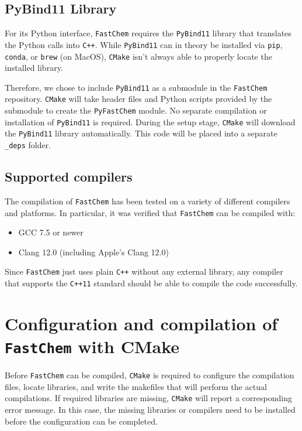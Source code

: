\documentclass[numbers=noenddot]{aux/fcmanual}
\newcommand{\fc}{\texttt{FastChem}\xspace}
\newcommand{\cpp}{\ttt{C++}\xspace}
\newcommand{\pb}{\texttt{PyBind11}\xspace}
\newcommand{\ttt}[1]{\texttt {#1}}
\begin{document}
\subsection{PyBind11 Library}

For its Python interface, \fc requires the \pb library that translates the Python calls into \cpp. While \pb can in theory be installed via \texttt{pip}, \texttt{conda}, or \texttt{brew} (on MacOS), \texttt{CMake} isn't always able to properly locate the installed library. 

Therefore, we chose to include \pb as a submodule in the \fc repository. \texttt{CMake} will take header files and Python scripts provided by the submodule to create the \texttt{PyFastChem} module. No separate compilation or installation of \pb is required. During the setup stage, \texttt{CMake} will download the \pb library automatically. This code will be placed into a separate \texttt{\_deps} folder.


\subsection{Supported compilers}

The compilation of \fc has been tested on a variety of different compilers and platforms. In particular, it was verified that \fc can be compiled with:
\begin{itemize}
  \item GCC 7.5 or newer
  \item Clang 12.0 (including Apple's Clang 12.0)
\end{itemize}

Since \fc just uses plain \cpp without any external library, any compiler that supports the \ttt{C++11} standard should be able to compile the code successfully.


\section{Configuration and compilation of \fc with CMake}
\label{sec:install_config}

Before \fc can be compiled, \texttt{CMake} is required to configure the compilation files, locate libraries, and write the makefiles that will perform the actual compilations. If required libraries are missing, \texttt{CMake} will report a corresponding error message. In this case, the missing libraries or compilers need to be installed before the configuration can be completed.\\
\end{document}
